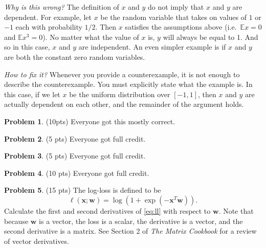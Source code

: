 \documentclass[10pt]{article}
\theoremstyle{definition}
\newtheorem{problem}{Problem}
\newcommand{\E}{\mathbb E}
\newcommand{\trans}[1]{{#1}^{T}}
\newcommand{\loss}{\ell}
\newcommand{\w}{\mathbf w}
\newcommand{\x}{\mathbf x}
\begin{document}
\noindent
\textit{Why is this wrong?}
The definition of $x$ and $y$ do not imply that $x$ and $y$ are dependent.
For example, let $x$ be the random variable that takes on values of $1$ or $-1$ each with probability $1/2$.
Then $x$ satisfies the assumptions above (i.e.\ $\E x = 0$ and $\E x^3 = 0$).
No matter what the value of $x$ is, $y$ will always be equal to 1.
And so in this case, $x$ and $y$ are independent.
An even simpler example is if $x$ and $y$ are both the constant zero random variables.

\vspace{0.1in}
\noindent
\textit{How to fix it?}
Whenever you provide a counterexample, it is not enough to describe the counterexample.
You must explicitly state what the example is.
In this case, if we let $x$ be the uniform distribution over $[-1,1]$,
then $x$ and $y$ are actually dependent on each other,
and the remainder of the argument holds.

\begin{problem}
    (10pts)
    Everyone got this mostly correct.
\end{problem}

\begin{problem}
    (5 pts)
    Everyone got full credit.
\end{problem}

\begin{problem}
    (5 pts)
    Everyone got full credit.
\end{problem}

\begin{problem}
    (10 pts)
    Everyone got full credit.
\end{problem}

\begin{problem}
    (15 pts)
    The log-loss is defined to be
    \begin{equation}
        \label{eq:ll}
        \loss(\x;\w) = \log(1+\exp(-\trans\x\w)) 
        .
    \end{equation}
    Calculate the first and second derivatives of \eqref{eq:ll} with respect to $\w$.
    Note that because $\w$ is a vector, the loss is a scalar, the derivative is a vector, and the second derivative is a matrix.
    See Section 2 of \emph{The Matrix Cookbook} for a review of vector derivatives.
\end{problem}
\end{document}
